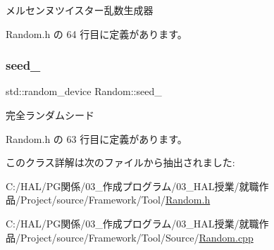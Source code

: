 メルセンヌツイスター乱数生成器 



 Random.\+h の 64 行目に定義があります。

\mbox{\label{class_random_a9dec4a6da7decaf52f9e972f63cc679c}} 
\subsubsection{\texorpdfstring{seed\+\_\+}{seed\_}}
{\footnotesize\ttfamily std\+::random\+\_\+device Random\+::seed\+\_\+\hspace{0.3cm}{\ttfamily [private]}}



完全ランダムシード 



 Random.\+h の 63 行目に定義があります。



このクラス詳解は次のファイルから抽出されました\+:\begin{DoxyCompactItemize}
\item 
C\+:/\+H\+A\+L/\+P\+G関係/03\+\_\+作成プログラム/03\+\_\+\+H\+A\+L授業/就職作品/\+Project/source/\+Framework/\+Tool/\mbox{\hyperlink{_random_8h}{Random.\+h}}\item 
C\+:/\+H\+A\+L/\+P\+G関係/03\+\_\+作成プログラム/03\+\_\+\+H\+A\+L授業/就職作品/\+Project/source/\+Framework/\+Tool/\+Source/\mbox{\hyperlink{_random_8cpp}{Random.\+cpp}}\end{DoxyCompactItemize}
